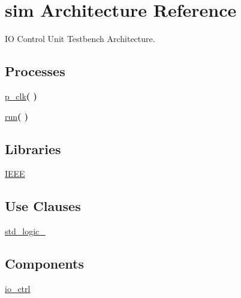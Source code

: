 \hypertarget{classtb__io__ctrl_1_1sim}{}\section{sim Architecture Reference}
\label{classtb__io__ctrl_1_1sim}


IO Control Unit Testbench Architecture.  


\subsection*{Processes}
 \begin{DoxyCompactItemize}
\item 
\mbox{\label{classtb__io__ctrl_1_1sim_af35c81fcf5e4601a4e5d669b422cf79a}} 
\hyperlink{classtb__io__ctrl_1_1sim_af35c81fcf5e4601a4e5d669b422cf79a}{p\+\_\+clk}{\bfseries  (  )}
\item 
\mbox{\label{classtb__io__ctrl_1_1sim_a0f40b896b2461e250ebafd4e27b8ff54}} 
\hyperlink{classtb__io__ctrl_1_1sim_a0f40b896b2461e250ebafd4e27b8ff54}{run}{\bfseries  (  )}
\end{DoxyCompactItemize}
\subsection*{Libraries}
 \begin{DoxyCompactItemize}
\item 
\mbox{\label{classtb__io__ctrl_1_1sim_ae4f03c286607f3181e16b9aa12d0c6d4}} 
\hyperlink{classtb__io__ctrl_1_1sim_ae4f03c286607f3181e16b9aa12d0c6d4}{I\+E\+EE} 
\end{DoxyCompactItemize}
\subsection*{Use Clauses}
 \begin{DoxyCompactItemize}
\item 
\mbox{\label{classtb__io__ctrl_1_1sim_acd03516902501cd1c7296a98e22c6fcb}} 
\hyperlink{classtb__io__ctrl_1_1sim_acd03516902501cd1c7296a98e22c6fcb}{std\+\_\+logic\+\_}   
\end{DoxyCompactItemize}
\subsection*{Components}
 \begin{DoxyCompactItemize}
\item 
\mbox{\label{classtb__io__ctrl_1_1sim_a97c813578819a319bf5e8c6d53894fea}} 
\hyperlink{classtb__io__ctrl_1_1sim_a97c813578819a319bf5e8c6d53894fea}{io\+\_\+ctrl}  {\bfseries }  
\end{DoxyCompactItemize}
